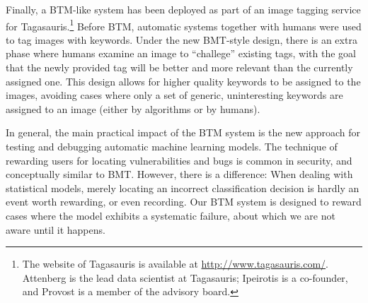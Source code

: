 Finally, a BTM-like system has been deployed as part of an image tagging service for Tagasauris.\footnote{The website of Tagasauris is available at \url{http://www.tagasauris.com/}. Attenberg is the lead data scientist at Tagasauris; Ipeirotis is a co-founder, and Provost is a member of the advisory board.} Before BTM, automatic systems together with humans were used to tag images with keywords. Under the new BMT-style design, there is an extra phase where humans examine an image to ``challege'' existing tags, with the goal that the newly provided tag will be better and more relevant than the currently assigned one.  This design allows for higher quality keywords to be assigned to the images, avoiding cases where only a set of generic, uninteresting keywords are assigned to an image (either by algorithms or by humans).

In general, the main practical impact of the BTM system is the new approach for testing and debugging automatic machine learning models. The technique of rewarding users for locating vulnerabilities and bugs is common in security, and conceptually similar to BMT. However, there is a difference: When dealing with statistical models, merely locating an incorrect classification decision is hardly an event worth rewarding, or even recording. Our BTM system is designed to reward cases where the model exhibits a systematic failure, about which we are not aware until it happens.